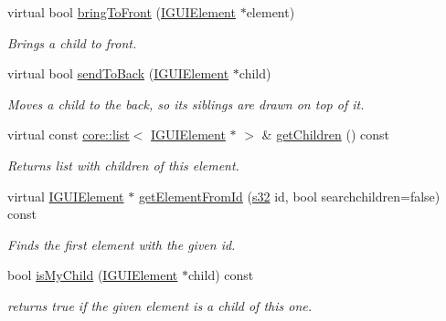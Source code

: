\begin{DoxyCompactItemize}
virtual bool \hyperlink{classirr_1_1gui_1_1IGUIElement_ac262c8018bf4101f38f448fde16f5a52}{bring\+To\+Front} (\hyperlink{classirr_1_1gui_1_1IGUIElement}{I\+G\+U\+I\+Element} $\ast$element)
\begin{DoxyCompactList}\small\item\em Brings a child to front. \end{DoxyCompactList}\item 
virtual bool \hyperlink{classirr_1_1gui_1_1IGUIElement_a9b1880048e7542dbe289295de69e77cd}{send\+To\+Back} (\hyperlink{classirr_1_1gui_1_1IGUIElement}{I\+G\+U\+I\+Element} $\ast$child)
\begin{DoxyCompactList}\small\item\em Moves a child to the back, so it\textquotesingle{}s siblings are drawn on top of it. \end{DoxyCompactList}\item 
\mbox{\label{classirr_1_1gui_1_1IGUIElement_a96492ba4d7974c1eae92f98b31b70d95}} 
virtual const \hyperlink{classirr_1_1core_1_1list}{core\+::list}$<$ \hyperlink{classirr_1_1gui_1_1IGUIElement}{I\+G\+U\+I\+Element} $\ast$ $>$ \& \hyperlink{classirr_1_1gui_1_1IGUIElement_a96492ba4d7974c1eae92f98b31b70d95}{get\+Children} () const
\begin{DoxyCompactList}\small\item\em Returns list with children of this element. \end{DoxyCompactList}\item 
virtual \hyperlink{classirr_1_1gui_1_1IGUIElement}{I\+G\+U\+I\+Element} $\ast$ \hyperlink{classirr_1_1gui_1_1IGUIElement_ab79b8e81d2f2864312345cffe9237cce}{get\+Element\+From\+Id} (\hyperlink{namespaceirr_ac66849b7a6ed16e30ebede579f9b47c6}{s32} id, bool searchchildren=false) const
\begin{DoxyCompactList}\small\item\em Finds the first element with the given id. \end{DoxyCompactList}\item 
bool \hyperlink{classirr_1_1gui_1_1IGUIElement_a72fe3668d62bfb7edc4586d582a947b4}{is\+My\+Child} (\hyperlink{classirr_1_1gui_1_1IGUIElement}{I\+G\+U\+I\+Element} $\ast$child) const
\begin{DoxyCompactList}\small\item\em returns true if the given element is a child of this one. \end{DoxyCompactList}\item 

\end{DoxyCompactItemize}

